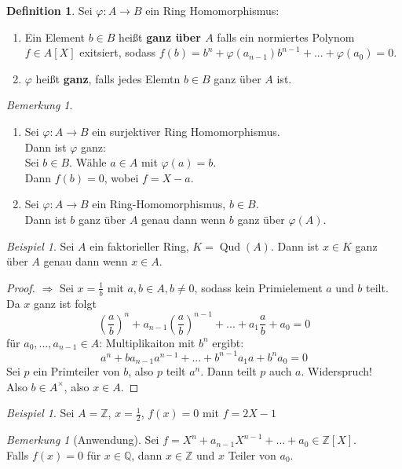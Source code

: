 \documentclass[10pt,a4paper]{article}
\newcommand{\Z}{\ensuremath{\mathbb{Z}}}
\newcommand{\Q}{\ensuremath{\mathbb{Q}}}
\newcommand{\Qud}{\operatorname{Qud}}
\newcounter{thm}[section]
\theoremstyle{definition}
\newtheorem{definition}[thm]{Definition}
\theoremstyle{plain}
\theoremstyle{remark}
\newtheorem{bem}[thm]{Bemerkung}
\newtheorem*{bem*}{Bemerkung}
\newtheorem{exm}[thm]{Beispiel}
\newtheorem*{exm*}{Beispiel}
\begin{document}
\begin{definition}
	Sei $\varphi:A\rightarrow B$ ein Ring Homomorphismus:
	\begin{enumerate}
		\item Ein Element $b\in B$ heißt \textbf{ganz über $A$} falls ein normiertes Polynom $f\in A[X]$ exitsiert, sodass $f(b)=b^n+\varphi(a_{n-1})b^{n-1}+...+\varphi(a_0)=0$.
		\item $\varphi$ heißt \textbf{ganz}, falls jedes Elemtn $b\in B$ ganz über $A$ ist.
	\end{enumerate}
\end{definition}
\begin{bem}
	\begin{enumerate}
		\item Sei $\varphi:A\rightarrow B$ ein surjektiver Ring Homomorphismus.\\
		Dann ist $\varphi$ ganz:\\
		Sei $b\in B$. Wähle $a\in A$ mit $\varphi(a)=b$.\\
		Dann $f(b)=0$, wobei $f=X-a$.
		\item Sei $\varphi:A\rightarrow B$ ein Ring-Homomorphismus, $b\in B$.\\
		Dann ist $b$ ganz über $A$ genau dann wenn $b$ ganz über $\varphi(A)$.
	\end{enumerate}
\end{bem}
\begin{exm}
	Sei $A$ ein faktorieller Ring, $K=\Qud(A)$. Dann ist $x\in K$ ganz über $A$ genau dann wenn $x\in A$.
\end{exm}
\begin{proof}
	$\Rightarrow$ Sei $x=\frac{1}{b}$ mit $a,b\in A, b\neq 0$, sodass kein Primielement $a$ und $b$ teilt.\\
	Da $x$ ganz ist folgt
	\[\left(\frac{a}{b}\right)^n+a_{n-1}\left(\frac{a}{b}\right)^{n-1}+...+a_1\frac{a}{b}+a_0=0\]
	für $a_0,...,a_{n-1}\in A$:
	Multiplikaiton mit $b^n$ ergibt:
	\[a^n+ba_{n-1}a^{n-1}+...+b^{n-1} a_1a+b^na_0=0\]
	Sei $p$ ein Primteiler von $b$, also $p$ teilt $a^n$. Dann teilt $p$ auch $a$. Widerspruch!\\
	Also $b\in A^\times$, also $x\in A$.
\end{proof}


\begin{exm*}
	Sei $A=\Z$, $x=\frac{1}{2}$, $f(x)=0$ mit $f=2X-1$
\end{exm*}
\begin{bem*}[Anwendung]
	Sei $f=X^n+a_{n-1}X^{n-1}+...+a_0\in \Z[X]$.\\
	Falls $f(x)=0$ für $x\in\Q$, dann $x\in\Z$ und $x$ Teiler von $a_0$.
\end{bem*}
\end{document}
